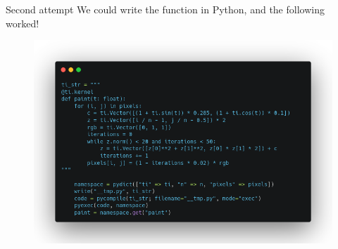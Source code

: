 \documentclass{beamer}
\begin{document}
\begin{frame}{Second attempt}
    We could write the function in Python, and the following worked!
    \begin{figure}[htpb]
        \begin{center}
            \includegraphics[width=.8\linewidth]{pic/code_03.png}
        \end{center}
    \end{figure}
\end{frame}
\end{document}
